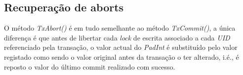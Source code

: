 \subsection{Recuperação de aborts}

O método \textit{TxAbort()} é em tudo semelhante ao método \textit{TxCommit()}, a única diferença é que antes de libertar cada \textit{lock} de escrita associado a cada \textit{UID} referenciado pela transação, o valor actual do \textit{PadInt} é substituído pelo valor registado como sendo o valor original antes da transação o ter alterado, i.é., é reposto o valor do último commit realizado com sucesso. 
